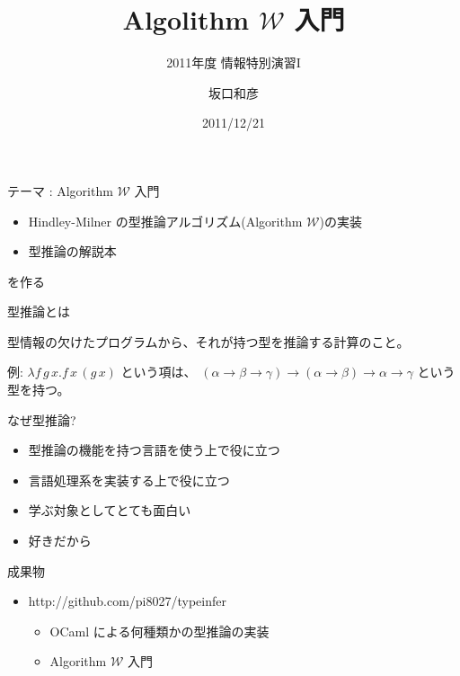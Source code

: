 \documentclass[cjk, 17pt]{beamer}
\title{Algolithm $\mathcal W$ 入門}
\subtitle{2011年度 情報特別演習I}
\author{坂口和彦}
\institute{筑波大学 情報学群 情報科学類 B1}
\date{2011/12/21}
\begin{document}
\begin{frame}[empty]

  \titlepage

\end{frame}

\begin{frame}{テーマ : Algorithm $\mathcal W$ 入門}

 \begin{itemize}
  \item Hindley-Milner の型推論アルゴリズム(Algorithm $\mathcal W$)の実装
  \item 型推論の解説本
 \end{itemize}
 を作る

\end{frame}

\begin{frame}{型推論とは}

 型情報の欠けたプログラムから、それが持つ型を推論する計算のこと。

 例: $\lambda f \, g \, x . f \, x \, (g \, x)$ という項は、
 $(\alpha \to \beta \to \gamma) \to (\alpha \to \beta) \to \alpha \to \gamma$
 という型を持つ。

\end{frame}

\begin{frame}{なぜ型推論?}

 \begin{itemize}
  \item 型推論の機能を持つ言語を使う上で役に立つ
  \item 言語処理系を実装する上で役に立つ
  \item 学ぶ対象としてとても面白い
  \item 好きだから
 \end{itemize}

\end{frame}

\begin{frame}{成果物}

 \begin{itemize}
  \item http://github.com/pi8027/typeinfer
  \begin{itemize}
   \item OCaml による何種類かの型推論の実装
   \item Algorithm $\mathcal W$ 入門
  \end{itemize}
 \end{itemize}

\end{frame}
\end{document}
